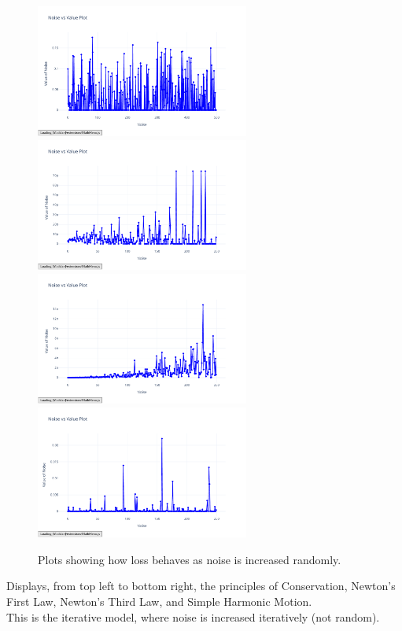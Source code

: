 \documentclass{article}
\begin{document}
\begin{figure}[H]
    \centering
    \includegraphics[width=7cm]{noise_conservation_random}
    \includegraphics[width=7cm]{noise_Newtons_First_Law_random}
    \includegraphics[width=7cm]{noise_Newtons_Third_Law_random}
    \includegraphics[width=7cm]{noise_Simple_Harmonic_Motion}
    \caption{Plots showing how loss behaves as noise is increased randomly.}
    \label{fig:noise_plots}
\end{figure}

Displays, from top left to bottom right, the principles of Conservation, Newton's First Law, Newton's Third Law, and Simple Harmonic Motion.\\

This is the iterative model, where noise is increased iteratively (not random).\\ 
\end{document}
